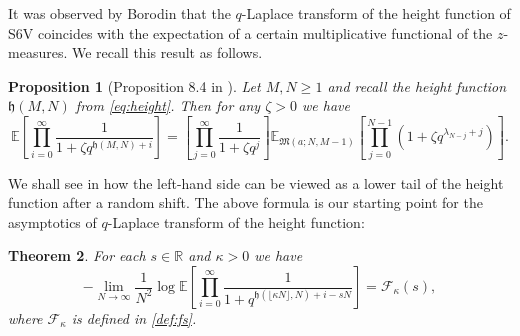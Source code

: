 \documentclass[reqno,11pt]{amsart}
\newcommand{\h}{\mathfrak{h}}
\newcommand{\gint}{\mathfrak{M}(a;N,M-1)}
\numberwithin{equation}{section}
\newtheorem{proposition}{Proposition}[section]
\newtheorem{theorem}[proposition]{Theorem}
\theoremstyle{definition}
\newcommand{\R}{\mathbb{R}}
\begin{document}
It was observed by Borodin \cite{borodin2016stochastic_MM,BO2016_ASEP} that the $q$-Laplace transform of the height function of S6V coincides with the expectation of a certain multiplicative functional of the $z$-measures. We recall this result as follows.

\begin{proposition}[Proposition 8.4 in \cite{BO2016_ASEP}]
    Let $M,N\geq 1$ and recall the height function $\h(M,N)$ from \eqref{eq:height}. Then for any $\zeta>0$ we have 
    \begin{equation}\label{e.mommatch}
        \mathbb{E} \left[\prod_{i=0}^\infty\frac{1}{1+\zeta q^{\mathfrak{h}(M,N)+i}}\right]=\left[\prod_{j=0}^{\infty} \frac1{1+\zeta q^j}\right]\mathbb{E}_{\gint}\left[\prod_{j=0}^{N-1} (1+\zeta q^{\lambda_{N-j}+j})\right].
    \end{equation}
\end{proposition}

We shall see in  how the left-hand side can be viewed as a lower tail of the height function after a random shift.
The above formula is our starting point for the asymptotics of $q$-Laplace transform of the height function:
 \begin{theorem}\label{p.multldp}
    For each $s\in \R$ and $\kappa>0$ we have 
    \begin{equation}\label{e.multldp}
        -\lim_{N\to \infty} \frac{1}{N^2}\log \mathbb{E}\left[\prod_{i=0}^\infty\frac{1}{1+ q^{\mathfrak{h}(\lfloor\kappa N\rfloor,N)+i-sN}}\right] = \mathcal{F}_\kappa(s),
    \end{equation}
    where $\mathcal{F}_\kappa$ is defined in \eqref{def:fs}.
\end{theorem}
\end{document}
